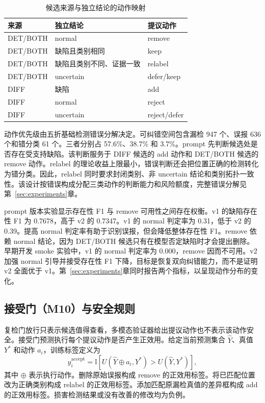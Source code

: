\begin{table}[t]
  \centering
  \caption{候选来源与独立结论的动作映射}
  \label{tab:action-map}
  \begin{tabular}{lll}
    \hline
    来源 & 独立结论 & 提议动作 \\
    \hline
    DET/BOTH & normal & remove \\
    DET/BOTH & 缺陷且类别相同 & keep \\
    DET/BOTH & 缺陷且类别不同、证据一致 & relabel \\
    DET/BOTH & uncertain & defer/keep \\
    DIFF & 缺陷 & add \\
    DIFF & normal & reject \\
    DIFF & uncertain & reject/defer \\
    \hline
  \end{tabular}
\end{table}

动作优先级由五折基础检测错误分解决定。可纠错空间包含漏检 947 个、误报 636 个和错分类 61 个。三者分别占 57.6\%、38.7\% 和 3.7\%。prompt 先判断候选处是否存在受支持缺陷。该判断服务于 DIFF 候选的 add 动作和 DET/BOTH 候选的 remove 动作。relabel 的理论收益上限最小，错误判断还会把位置正确的检测转化为错分类。因此，relabel 同时要求封闭类别、非 uncertain 结论和类别拓扑一致性。该设计按错误构成分配三类动作的判断能力和风险额度，完整错误分解见第~\ref{sec:experiments}章。

prompt 版本实验显示存在性 F1 与 remove 可用性之间存在权衡。v1 的缺陷存在性 F1 为 0.7678，高于 v2 的 0.7347。v1 的 normal 判定率为 0.31，低于 v2 的 0.39。提高 normal 判定率有助于识别误报，但会降低整体存在性 F1。remove 依赖 normal 结论，因为 DET/BOTH 候选只有在模型否定缺陷时才会提出删除。早期开发 smoke 实验中，v1 的 normal 判定率为 0.000，remove 因而不可用。v2 加强 normal 引导并接受存在性 F1 下降，目标是恢复双向纠错能力，而不是证明 v2 全面优于 v1。第~\ref{sec:experiments}章同时报告两个指标，以呈现动作分布的变化。

\subsection{接受门（M10）与安全规则}
\label{subsec:acceptance-gate}

复检门放行只表示候选值得查看，多模态验证器给出提议动作也不表示该动作安全。接受门预测执行每个提议动作是否产生正效用。给定当前预测集合 $\hat{Y}$、真值 $Y^{*}$ 和动作 $a_i$，训练标签定义为
\begin{equation}
 y_i^{\mathrm{accept}}=
 \mathbb{I}\!\left[U(\hat{Y}\oplus a_i,Y^{*})>U(\hat{Y},Y^{*})\right],
 \label{eq:accept-label}
\end{equation}
其中 $\oplus$ 表示执行动作。删除原始误报构成 remove 的正效用标签。将已匹配位置改为正确类别构成 relabel 的正效用标签。添加匹配原漏检真值的差异框构成 add 的正效用标签。损害检测结果或没有改善的修改均为负例。

